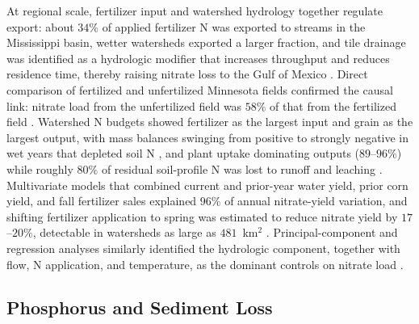 At regional scale, fertilizer input and watershed hydrology together
regulate export: about $34\%$ of applied fertilizer N was exported to
streams in the Mississippi basin, wetter watersheds exported a larger
fraction, and tile drainage was identified as a hydrologic modifier that
increases throughput and reduces residence time, thereby raising nitrate
loss to the Gulf of Mexico \parencite{Raymond2012}. Direct comparison of
fertilized and unfertilized Minnesota fields confirmed the causal link:
nitrate load from the unfertilized field was $58\%$ of that from the
fertilized field \parencite{Ghane2016b}. Watershed N budgets showed
fertilizer as the largest input and grain as the largest output, with
mass balances swinging from positive to strongly negative in wet years
that depleted soil N \parencite{Gentry2009}, and plant uptake dominating
outputs ($89$--$96\%$) while roughly $80\%$ of residual soil-profile N was
lost to runoff and leaching \parencite{Dattamudi2020}. Multivariate models
that combined current and prior-year water yield, prior corn yield, and
fall fertilizer sales explained $96\%$ of annual nitrate-yield variation,
and shifting fertilizer application to spring was estimated to reduce
nitrate yield by $17$--$20\%$, detectable in watersheds as large as
$481$~km$^2$ \parencite{Gentry2014}. Principal-component and regression
analyses similarly identified the hydrologic component, together with
flow, N application, and temperature, as the dominant controls on nitrate
load \parencite{Li2015}.

\subsection{Phosphorus and Sediment Loss}

